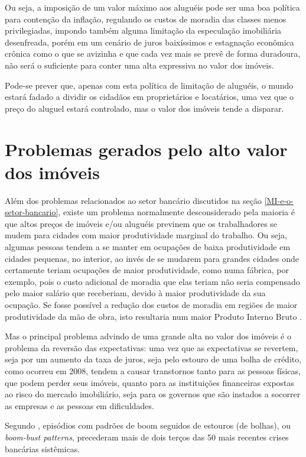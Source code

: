 \documentclass[
	12pt,				%
	oneside,			%
	a4paper,			%
	chapter=TITLE,		%
	section=TITLE,		%
	english,			%
	brazil				%
	]{abntex2}
\begin{document}
Ou seja, a imposição de um valor máximo aos aluguéis pode ser uma boa
política para contenção da inflação, regulando os custos de moradia das
classes menos privilegiadas, impondo também alguma limitação da
especulação imobiliária desenfreada, porém em um cenário de juros
baixíssimos e estagnação econômica crônica como o que se avizinha e que
cada vez mais se prevê de forma duradoura, não será o suficiente para
conter uma alta expressiva no valor dos imóveis.

Pode-se prever que, apenas com esta política de limitação de aluguéis, o
mundo estará fadado a dividir os cidadãos em proprietários e locatários,
uma vez que o preço do aluguel estará controlado, mas o valor dos
imóveis tende a disparar.

\section{Problemas gerados pelo alto valor dos
imóveis}\label{problemas-gerados-pelo-alto-valor-dos-imuxf3veis}

Além dos problemas relacionados ao setor bancário discutidos na seção
\ref{MI-e-o-setor-bancario}, existe um problema normalmente
desconsiderado pela maioria é que altos preços de imóveis e/ou aluguéis
previnem que os trabalhadores se mudem para cidades com maior
produtividade marginal do trabalho. Ou seja, algumas pessoas tendem a se
manter em ocupações de baixa produtividade em cidades pequenas, no
interior, ao invés de se mudarem para grandes cidades onde certamente
teriam ocupações de maior produtividade, como numa fábrica, por exemplo,
pois o custo adicional de moradia que elas teriam não seria compensado
pelo maior salário que receberiam, devido à maior produtividade da sua
ocupação. Se fosse possível a redução dos custos de moradia em regiões
de maior produtividade da mão de obra, isto resultaria num maior Produto
Interno Bruto \autocite[149]{Case2000}.

Mas o principal problema advindo de uma grande alta no valor dos imóveis
é o problema da reversão das expectativas: uma vez que as expectativas
se revertem, seja por um aumento da taxa de juros, seja pelo estouro de
uma bolha de crédito, como ocorreu em 2008, tendem a causar transtornos
tanto para as pessoas físicas, que podem perder seus imóveis, quanto
para as instituições financeiras expostas ao risco do mercado
imobiliário, seja para os governos que são instados a socorrer as
empresas e as pessoas em dificuldades.

Segundo \textcite{fmiera}, episódios com padrões de boom seguidos de
estouros (de bolhas), ou \emph{boom-bust patterns}, precederam mais de
dois terços das 50 mais recentes crises bancárias sistêmicas.
\end{document}

